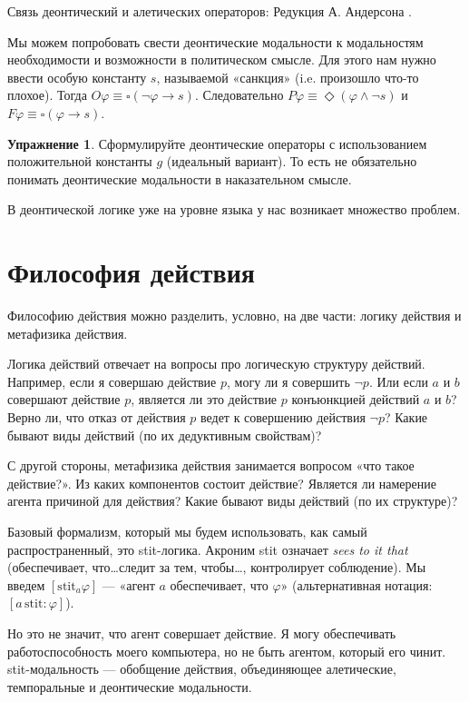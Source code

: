 \documentclass[openany]{book}
\theoremstyle{plain}
\theoremstyle{definition}
\newtheorem{xrc}{Упражнение}[]
\begin{document}
Связь деонтический и алетических операторов: Редукция А. Андерсона \cite{Anderson}. 

Мы можем попробовать свести деонтические модальности к модальностям необходимости и возможности в политическом смысле. Для этого нам нужно ввести особую константу \(s\), называемой «санкция» (i.e. произошло что-то плохое). Тогда \(O \varphi \equiv \square (\neg \varphi \to s)\). Следовательно \(P \varphi \equiv \Diamond (\varphi \land \neg s)\) и \(F \varphi \equiv \square (\varphi \to s)\).

\begin{xrc}
Сформулируйте деонтические операторы с использованием положительной константы \(g\) (идеальный вариант). То есть не обязательно понимать деонтические модальности в наказательном смысле.
\end{xrc}

В деонтической логике уже на уровне языка у нас возникает множество проблем.

\section{Философия действия}

Философию действия можно разделить, условно, на две части: логику действия и метафизика действия.

Логика действий отвечает на вопросы про логическую структуру действий. Например, если я совершаю действие \(p\), могу ли я совершить \(\neg p\). Или если \(a\) и \(b\) совершают действие \(p\), является ли это действие \(p\) конъюнкцией действий \(a\) и \(b\)? Верно ли, что отказ от действия \(p\) ведет к совершению действия \(\neg p\)? Какие бывают виды действий (по их дедуктивным свойствам)?

С другой стороны, метафизика действия занимается вопросом «что такое действие?». Из каких компонентов состоит действие? Является ли намерение агента причиной для действия? Какие бывают виды действий (по их структуре)?

Базовый формализм, который мы будем использовать, как самый распространенный, это stit-логика. Акроним stit означает \textit{sees to it that} (обеспечивает, что\dots следит за тем, чтобы\dots, контролирует соблюдение). Мы введем \([\mathrm{stit}_{a}\varphi]\) --- «агент \(a\) обеспечивает, что \(\varphi\)» (альтернативная нотация: \([a \,\mathrm{stit}: \varphi]\)).

Но это не значит, что агент совершает действие. Я могу обеспечивать работоспособность моего компьютера, но не быть агентом, который его чинит. stit-модальность --- обобщение действия, объединяющее алетические, темпоральные и деонтические модальности. 
\end{document}
